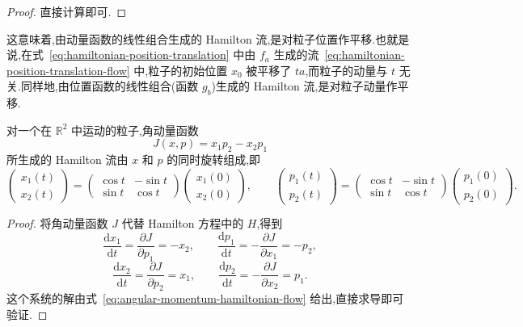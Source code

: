 \begin{proof}
直接计算即可.
\end{proof}

这意味着,由动量函数的线性组合生成的 Hamilton 流,是对粒子位置作平移.也就是说,在式~\eqref{eq:hamiltonian-position-translation} 中由 $f_{a}$ 生成的流~\eqref{eq:hamiltonian-position-translation-flow} 中,粒子的初始位置 $x_{0}$ 被平移了 $ta$,而粒子的动量与 $t$ 无关.同样地,由位置函数的线性组合(函数 $g_{b}$)生成的 Hamilton 流,是对粒子动量作平移.

\begin{proposition}[角动量生成旋转]\label{pro:angular-momentum-flow}
对一个在 $\mathbb{R}^{2}$ 中运动的粒子,角动量函数
\[
  J(x,p)=x_{1}p_{2}-x_{2}p_{1}
\]
所生成的 Hamilton 流由 $x$ 和 $p$ 的同时旋转组成,即
\begin{equation}
  \begin{pmatrix}x_{1}(t)\\x_{2}(t)\end{pmatrix}
  =\begin{pmatrix}\cos t&-\sin t\\\sin t&\cos t\end{pmatrix}
   \begin{pmatrix}x_{1}(0)\\x_{2}(0)\end{pmatrix},
  \qquad
  \begin{pmatrix}p_{1}(t)\\p_{2}(t)\end{pmatrix}
  =\begin{pmatrix}\cos t&-\sin t\\\sin t&\cos t\end{pmatrix}
   \begin{pmatrix}p_{1}(0)\\p_{2}(0)\end{pmatrix}.
  \label{eq:angular-momentum-hamiltonian-flow}
\end{equation}
\end{proposition}

\begin{proof}
将角动量函数 $J$ 代替 Hamilton 方程中的 $H$,得到
\[
  \frac{\mathrm{d}x_{1}}{\mathrm{d}t}=\frac{\partial J}{\partial p_{1}}=-x_{2},
  \qquad
  \frac{\mathrm{d}p_{1}}{\mathrm{d}t}=-\frac{\partial J}{\partial x_{1}}=-p_{2},
\]
\[
  \frac{\mathrm{d}x_{2}}{\mathrm{d}t}=\frac{\partial J}{\partial p_{2}}=x_{1},
  \qquad
  \frac{\mathrm{d}p_{2}}{\mathrm{d}t}=-\frac{\partial J}{\partial x_{2}}=p_{1}.
\]
这个系统的解由式~\eqref{eq:angular-momentum-hamiltonian-flow} 给出,直接求导即可验证.
\end{proof}

